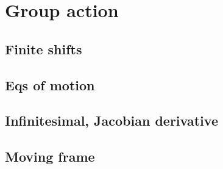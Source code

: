 \subsection{\CLe}


\section{Group action}

\subsection{Finite shifts}
\subsection{Eqs of motion}
\subsection{Infinitesimal, Jacobian derivative}
\subsection{Moving frame}

